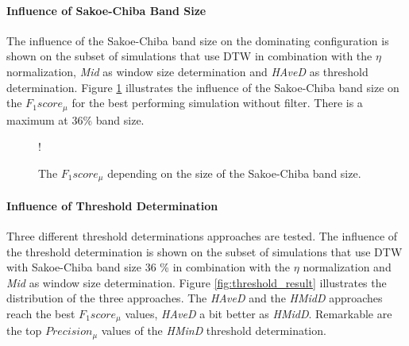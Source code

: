 \paragraph{Influence of Sakoe-Chiba Band Size} The influence of the Sakoe-Chiba band size on the dominating
configuration is shown on the subset of simulations that use DTW in combination with the $\eta$ normalization,
\textit{Mid} as window size determination and \textit{HAveD} as threshold determination. Figure
\ref{fig:sakoe-chiba_band_result} illustrates the influence of the Sakoe-Chiba band size on the $F_{1}score_{\mu}$ for
the best performing simulation without filter. There is a maximum at 36\% band size.

\begin{figure}
    \begin{minipage}{0.55\textwidth}
        \resizebox {\textwidth} {!} {
        }
    \end{minipage}\hfill
    \begin{minipage}{0.4\textwidth}
        \caption{The $F_{1}score_{\mu}$ depending on the size of the Sakoe-Chiba band size.}
        \label{fig:sakoe-chiba_band_result}
    \end{minipage}
\end{figure}

\paragraph{Influence of Threshold Determination} Three different threshold determinations approaches are tested. The
influence of the threshold determination is shown on the subset of simulations that use DTW with Sakoe-Chiba band size
36 \% in combination with the $\eta$ normalization and \textit{Mid} as window size determination. Figure
\ref{fig:threshold_result} illustrates the distribution of the three approaches. The \textit{HAveD} and the
\textit{HMidD} approaches reach the best $F_{1}score_{\mu}$ values, \textit{HAveD} a bit better as \textit{HMidD}.
Remarkable are the top $Precision_{\mu}$ values of the \textit{HMinD} threshold determination.

